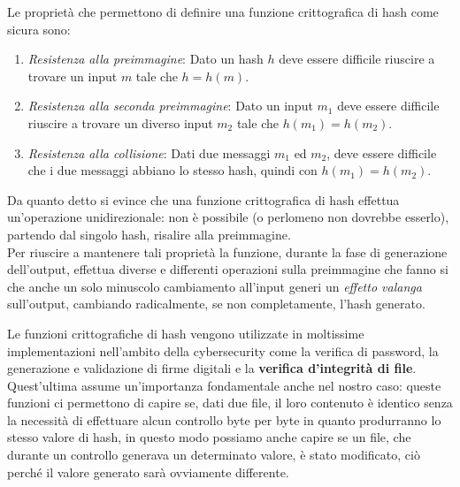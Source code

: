 Le proprietà che permettono di definire una funzione crittografica di hash come sicura sono:
\begin{enumerate}
    \item \emph{Resistenza alla preimmagine}: Dato un hash \(h\) deve essere difficile riuscire a
    trovare un input \(m\) tale che \(h = h(m)\).
    \item \emph{Resistenza alla seconda preimmagine}: Dato un input \(m_1\) deve essere difficile
    riuscire a trovare un diverso input \(m_2\) tale che \(h(m_1) = h(m_2)\).
    \item \emph{Resistenza alla collisione}: Dati due messaggi \(m_1\) ed \(m_2\), deve essere
    difficile che i due messaggi abbiano lo stesso hash, quindi con \(h(m_1) = h(m_2)\).
\end{enumerate}
Da quanto detto si evince che una funzione crittografica di
hash effettua un'operazione unidirezionale: non è possibile (o perlomeno non dovrebbe esserlo),
partendo dal singolo hash, risalire alla preimmagine. \\
Per riuscire a mantenere tali proprietà la funzione, durante la fase di generazione
dell'output, effettua diverse e differenti operazioni sulla preimmagine
che fanno si che anche un solo minuscolo cambiamento all'input generi
un \emph{effetto valanga} sull'output, cambiando radicalmente, se non completamente,
l'hash generato.

Le funzioni crittografiche di hash vengono utilizzate in moltissime implementazioni
nell'ambito della cybersecurity come la verifica di password, la generazione e
validazione di firme digitali e la \textbf{verifica d'integrità di file}.
Quest'ultima assume un'importanza fondamentale anche nel nostro caso: queste funzioni
ci permettono di capire se, dati due file, il loro contenuto è identico senza
la necessità di effettuare alcun controllo byte per byte in quanto produrranno
lo stesso valore di hash, in questo modo possiamo anche capire se un file,
che durante un controllo generava un determinato valore, è stato modificato,
ciò perché il valore generato sarà ovviamente differente.



